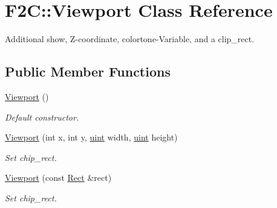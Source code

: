 \hypertarget{class_f2_c_1_1_viewport}{
\section{F2C::Viewport Class Reference}
\label{class_f2_c_1_1_viewport}
}


Additional show, Z-\/coordinate, colortone-\/Variable, and a clip\_\-rect.  


\subsection*{Public Member Functions}
\begin{DoxyCompactItemize}
\item 
\hypertarget{class_f2_c_1_1_viewport_a389ea1f7672c28a4d54f9877287ea5bd}{
\hyperlink{class_f2_c_1_1_viewport_a389ea1f7672c28a4d54f9877287ea5bd}{Viewport} ()}
\label{class_f2_c_1_1_viewport_a389ea1f7672c28a4d54f9877287ea5bd}

\begin{DoxyCompactList}\small\item\em Default constructor. \item\end{DoxyCompactList}\item 
\hyperlink{class_f2_c_1_1_viewport_a95b9c60d6537d37caf560a93c509735b}{Viewport} (int x, int y, \hyperlink{namespace_f2_c_a58be2bac9eb3e3c99cb41b6008bf4fae}{uint} width, \hyperlink{namespace_f2_c_a58be2bac9eb3e3c99cb41b6008bf4fae}{uint} height)
\begin{DoxyCompactList}\small\item\em Set chip\_\-rect. \item\end{DoxyCompactList}\item 
\hyperlink{class_f2_c_1_1_viewport_a8d66a03451361d3bc5e783242e6a5dfe}{Viewport} (const \hyperlink{class_f2_c_1_1_rect}{Rect} \&rect)
\begin{DoxyCompactList}\small\item\em Set chip\_\-rect. \item\end{DoxyCompactList}\end{DoxyCompactItemize}
